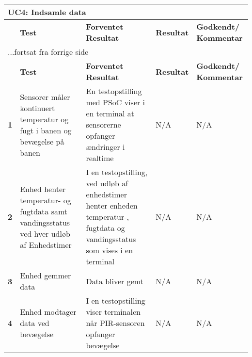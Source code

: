 
\begin{center}
\begin{longtable}{|p{}|p{}|p{}|p{}|p{}|} %
\hline
\multicolumn{5}{|l|}{\textbf{UC4: Indsamle data}} \\ \hline
\multicolumn{1}{|c|}{} &
\textbf{Test} &
\textbf{Forventet \newline Resultat} &
\textbf{Resultat} &
\textbf{Godkendt/ \newline Kommentar} \\ \hline 
\endfirsthead

\multicolumn{5}{l}{...fortsat fra forrige side} \\ \hline 
\multicolumn{1}{|c|}{} &
\textbf{Test} &
\textbf{Forventet \newline Resultat} &
\textbf{Resultat} &
\textbf{Godkendt/ \newline Kommentar} \\ \hline 
\endhead

\textbf{1}	&Sensorer måler kontinuert temperatur og fugt i banen og bevægelse på banen
			&En testopstilling med PSoC viser i en terminal at sensorerne opfanger ændringer i realtime
			&N/A
			&N/A \\ \hline 
			
\textbf{2}	&Enhed henter temperatur- og fugtdata samt vandingsstatus ved hver udløb af Enhedstimer
			&I en testopstilling, ved udløb af enhedstimer henter enheden temperatur-, fugtdata og vandingsstatus som vises i en terminal
			&N/A
			&N/A \\ \hline 
			
\textbf{3}	&Enhed gemmer data
			&Data bliver gemt
			&N/A
			&N/A \\ \hline 
			
\textbf{4}	&Enhed modtager data ved bevægelse
			&I en testopstilling viser terminalen når PIR-sensoren opfanger bevægelse
			&N/A
			&N/A \\ \hline 
			
\end{longtable}
	\label{ATUC4} 
\end{center}
